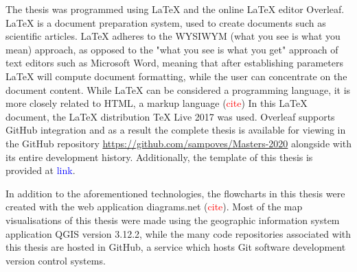 The thesis was programmed using LaTeX and the online LaTeX editor Overleaf. LaTeX is a document preparation system, used to create documents such as scientific articles. LaTeX adheres to the WYSIWYM (what you see is what you mean) approach, as opposed to the "what you see is what you get" approach of text editors such as Microsoft Word, meaning that after establishing parameters LaTeX will compute document formatting, while the user can concentrate on the document content. While LaTeX can be considered a programming language, it is more closely related to HTML, a markup language (\textcolor{red}{cite}) In this LaTeX document, the LaTeX distribution TeX Live 2017 was used. Overleaf supports GitHub integration and as a result the complete thesis is available for viewing in the GitHub repository \textcolor{blue}{\url{https://github.com/sampoves/Masters-2020}} alongside with its entire development history. Additionally, the template of this thesis is provided at \textcolor{blue}{link}.

In addition to the aforementioned technologies, the flowcharts in this thesis were created with the web application diagrams.net (\textcolor{red}{cite}). Most of the map visualisations of this thesis were made using the geographic information system application QGIS version 3.12.2, while the many code repositories associated with this thesis are hosted in GitHub, a service which hosts Git software development version control systems.

